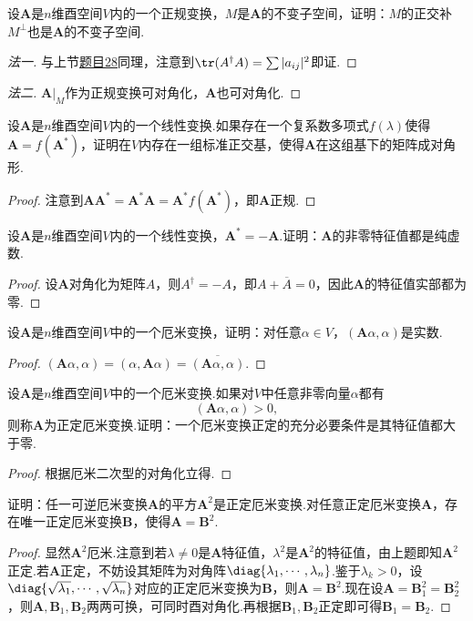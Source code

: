 \begin{prob}[14]
	设$\bm A$是$n$维酉空间$V$内的一个正规变换，$M$是$\bm A$的不变子空间，证明：$M$的正交补$M^\perp$也是$\bm A$的不变子空间.
\end{prob}
\begin{proof}[法一]
	与上节\hyperlink{NormalTansformationInvariantSubspace}{题目28}同理，注意到$\tr(A^\dagger A)=\sum|a_{ij}|^2$即证.
\end{proof}
\begin{proof}[法二]
	$\bm A|_M$作为正规变换可对角化，$\bm A$也可对角化.
\end{proof}
\begin{prob}[15]
	设$\bm A$是$n$维酉空间$V$内的一个线性变换.如果存在一个复系数多项式$f(\lambda)$使得$\bm A=f(\bm A^*)$，证明在$V$内存在一组标准正交基，使得$\bm A$在这组基下的矩阵成对角形.
\end{prob}
\begin{proof}
	注意到$\bm A\bm A^*=\bm A^*\bm A=\bm A^*f(\bm A^*)$，即$\bm A$正规.
\end{proof}
\begin{prob}[16]
	设$\bm A$是$n$维酉空间$V$内的一个线性变换，$\bm A^*=-\bm A$.证明：$\bm A$的非零特征值都是纯虚数.
\end{prob}
\begin{proof}
	设$\bm A$对角化为矩阵$A$，则$A^\dagger=-A$，即$A+\overline{A}=0$，因此$\bm A$的特征值实部都为零.
\end{proof}
\begin{prob}[17]
	设$\bm A$是$n$维酉空间$V$中的一个厄米变换，证明：对任意$\alpha\in V$，$(\bm A\alpha,\alpha)$是实数.
\end{prob}
\begin{proof}
	$(\bm A\alpha,\alpha)=(\alpha,\bm A\alpha)=\overline{(\bm A\alpha,\alpha)}$.
\end{proof}
\begin{prob}[18]
	设$\bm A$是$n$维酉空间$V$中的一个厄米变换.如果对$V$中任意非零向量$\alpha$都有
	\[
		(\bm A\alpha,\alpha)>0,
	\]
	则称$\bm A$为{\heiti 正定厄米变换}.证明：一个厄米变换正定的充分必要条件是其特征值都大于零.
\end{prob}
\begin{proof}
	根据厄米二次型的对角化立得.
\end{proof}
\begin{prob}[19]
	证明：任一可逆厄米变换$\bm A$的平方$\bm A^2$是正定厄米变换.对任意正定厄米变换$\bm A$，存在唯一正定厄米变换$\bm B$，使得$\bm A=\bm B^2$.
\end{prob}
\begin{proof}
	显然$\bm A^2$厄米.注意到若$\lambda\ne 0$是$\bm A$特征值，$\lambda^2$是$\bm A^2$的特征值，由上题即知$\bm A^2$正定.若$\bm A$正定，不妨设其矩阵为对角阵$\diag{\lambda_1,\cdots,\lambda_n}$.鉴于$\lambda_k>0$，设$\diag{\sqrt{\lambda_1},\cdots,\sqrt{\lambda_n}}$对应的正定厄米变换为$\bm B$，则$\bm A=\bm B^2$.现在设$\bm A=\bm B_1^2=\bm B_2^2$，则$\bm A,\bm B_1,\bm B_2$两两可换，可同时酉对角化.再根据$\bm B_1,\bm B_2$正定即可得$\bm B_1=\bm B_2$.
\end{proof}
